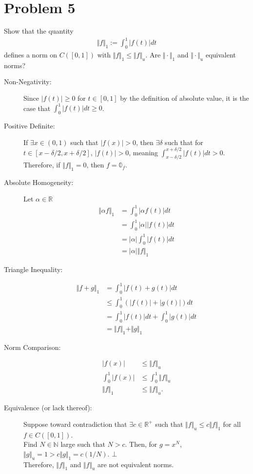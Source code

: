\documentclass[10pt]{extarticle}
\newcommand{\N}{\mathbb{N}}
\newcommand{\R}{\mathbb{R}}
\begin{document}
  \section{Problem 5}%
  Show that the quantity
  \begin{align*}
    \Vert f \Vert_1 := \int_{0}^{1}|f(t)| dt
  \end{align*}
  defines a norm on $C([0,1])$ with $\Vert f\Vert_1 \leq \Vert f \Vert_u$. Are $\Vert \cdot \Vert_1$ and $\Vert \cdot \Vert_u$ equivalent norms?
  \begin{description}
    \item[Non-Negativity:] Since $|f(t)| \geq 0$ for $t\in [0,1]$ by the definition of absolute value, it is the case that $\int_{0}^{1}|f(t)|dt\geq 0$.
    \item[Positive Definite:] If $\exists x\in (0,1)$ such that $|f(x)| > 0$, then $\exists \delta$ such that for $t\in [x-\delta/2,x+\delta/2]$, $|f(t)| > 0$, meaning $\displaystyle \int_{x-\delta/2}^{x+\delta/2}|f(t)| dt> 0$. Therefore, if $\Vert f \Vert_{1} = 0$, then $f = \mathbb{0}_f$.
    \item[Absolute Homogeneity:] Let $\alpha\in\R$
      \begin{align*}
        \Vert \alpha f \Vert_1 &= \int_{0}^{1}|\alpha f(t)|dt\\
                               &= \int_{0}^{1}|\alpha||f(t)|dt\\
                               &= |\alpha|\int_{0}^{1}|f(t)|dt\\
                               &= |\alpha|\Vert f\Vert_1
      \end{align*}
    \item[Triangle Inequality:]
      \begin{align*}
        \Vert f + g \Vert_1 &= \int_{0}^{1}|f(t) + g(t)|dt\\
                            &\leq \int_{0}^{1}\left(|f(t)| + |g(t)|\right)dt\\
                            &= \int_{0}^{1}|f(t)|dt + \int_{0}^{1}|g(t)|dt\\
                            &= \Vert f \Vert_1 + \Vert g \Vert_1
      \end{align*}
    \item[Norm Comparison:]
      \begin{align*}
        |f(x)| &\leq \Vert f \Vert_u \tag*{Definition of Supremum}\\
        \int_{0}^{1}|f(x)| &\leq \int_{0}^{1}\Vert f \Vert_{u}\\
        \Vert f \Vert_{1} &\leq \Vert f \Vert_{u}.
      \end{align*}
    \item[Equivalence (or lack thereof):] Suppose toward contradiction that $\exists c\in \R^{+}$ such that $\Vert f \Vert_{u} \leq c\Vert f \Vert_{1}$ for all $f\in C([0,1])$.\\

      Find $N\in \N$ large such that $N > c$. Then, for  $g = x^{N}$, $\Vert g \Vert_{u} = 1 > c\Vert g \Vert_{1} = c(1/N)$. $\bot$\\

      Therefore, $\Vert f \Vert_{1}$ and $\Vert f \Vert_{u}$ are not equivalent norms.
  \end{description}
\end{document}
